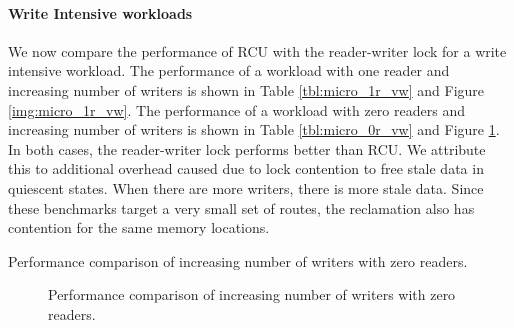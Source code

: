 \documentclass[12pt,a4paper]{article}
\begin{document}
\paragraph{Write Intensive workloads}
We now compare the performance of RCU with the reader-writer lock for a write intensive workload. The performance of a workload with one reader and increasing number of writers is shown in Table \ref{tbl:micro_1r_vw} and Figure \ref{img:micro_1r_vw}. The performance of a workload with zero readers and increasing number of writers is shown in Table \ref{tbl:micro_0r_vw} and Figure \ref{img:micro_0r_vw}. In both cases, the reader-writer lock performs better than RCU. We attribute this to additional overhead caused due to lock contention to free stale data in quiescent states. When there are more writers, there is more stale data. Since these benchmarks target a very small set of routes, the reclamation also has contention for the same memory locations.

\begin{table}[tph]
\begin{center}

\end{center}
\label{tbl:micro_0r_vw}
\caption{Performance comparison of increasing number of writers with zero readers.}
\end{table}

\begin{figure}[tph]
\begin{center}
\caption{Performance comparison of increasing number of writers with zero readers.}
\label{img:micro_0r_vw}
\end{center}
\end{figure}
\end{document}
